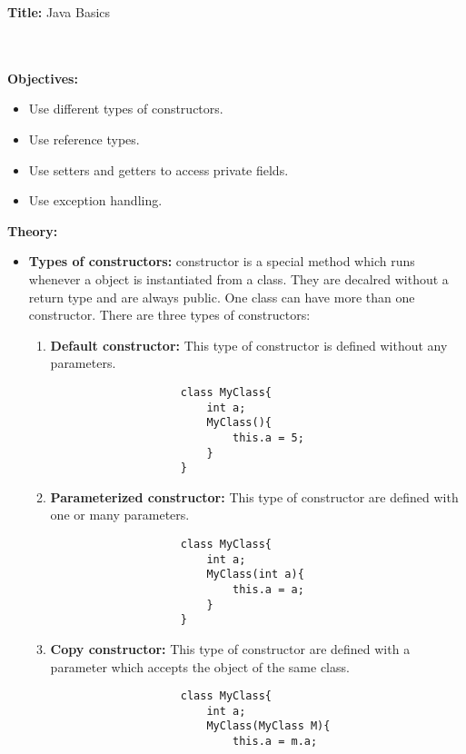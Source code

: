 \documentclass{book}
\begin{document}
{\Huge \textbf{Title:} Java Basics}
\\
\\
\\
\par
{\large \textbf{Objectives:}}
\begin{itemize}
    \item{Use different types of constructors.}
    \item{Use reference types.}
    \item{Use setters and getters to access private fields.}
    \item{Use exception handling.}
\end{itemize}
\par
{\large \textbf{Theory:}}
\begin{itemize}
    \item{\textbf{Types of constructors:}}
        constructor is a special method which runs whenever a object is instantiated from a class. They are decalred without a return type and are always public.
        One class can have more than one constructor. There are three types of constructors:
            \begin{enumerate}
                \item{\textbf{Default constructor:}} This type of constructor is defined without any parameters.
                \begin{verbatim}
                    class MyClass{
                        int a;
                        MyClass(){
                            this.a = 5;
                        }
                    }
                \end{verbatim}
                \item{\textbf{Parameterized constructor:}} This type of constructor are defined with one or many parameters.
                \begin{verbatim}
                    class MyClass{
                        int a;
                        MyClass(int a){
                            this.a = a;
                        }
                    }
                \end{verbatim}
                \item{\textbf{Copy constructor:}} This type of constructor are defined with a parameter which accepts the object of the same class.
                \begin{verbatim}
                    class MyClass{
                        int a;
                        MyClass(MyClass M){
                            this.a = m.a;

\end{verbatim}
\end{enumerate}
\end{itemize}
\end{document}
